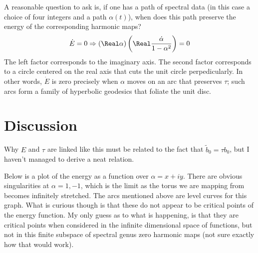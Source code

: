 \documentclass{article}
\begin{document}
A reasonable question to ask is, if one has a path of spectral data (in this case a choice of four integers and a path $\alpha(t)$), when does this path preserve the energy of the corresponding harmonic maps?
\[
\dot E = 0 \Rightarrow \left(\Real\alpha\right)\left( \Real\frac{\dot \alpha}{1-\alpha^2} \right) = 0
\]
The left factor corresponds to the imaginary axis. The second factor corresponds to a circle centered on the real axis that cuts the unit circle perpedicularly. In other words, $\dot E$ is zero precisely when $\alpha$ moves on an arc that preserves $\tau$; such arcs form a family of hyperbolic geodesics that foliate the unit disc.

\section*{Discussion}
Why $E$ and $\tau$ are linked like this must be related to the fact that $\tilde b_0 = \tau b_0$, but I haven't managed to derive a neat relation.

Below is a plot of the energy as a function over $\alpha = x + i y$. There are obvious singularities at $\alpha=1,-1$, which is the limit as the torus we are mapping from becomes infinitely stretched. The arcs mentioned above are level curves for this graph. What is curious though is that these do not appear to be critical points of the energy function. My only guess as to what is happening, is that they are critical points when considered in the infinite dimensional space of functions, but not in this finite subspace of spectral genus zero harmonic maps (not sure exactly how that would work).

\begin{center}
\end{center}
\end{document}
